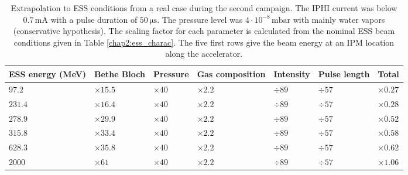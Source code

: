 \begin{table}[ht]
  \centering
  \caption[Extrapolation to ESS conditions from a real case during the second campaign]
  {Extrapolation to ESS conditions from a real case during the second campaign.
    The IPHI current was below $0.7\,\mathrm{mA}$ with a pulse duration of $50\, \mathrm{\mu s}$. The pressure level was $4 \cdot 10^{-8}\,\mathrm{mbar}$ with mainly water vapors (conservative hypothesis). The scaling factor for each parameter is calculated from the nominal ESS beam conditions given in Table \ref{chap2:ess_charac}. The five first rows give the beam energy at an IPM location along the accelerator.}
  \label{chap4:extrapolationMCP}
  \begin{tabularx}{\linewidth}{XXXXXXX}
    \toprule    ESS energy (MeV) & Bethe Bloch   & Pressure     & Gas composition & Intensity & Pulse length & Total         \\
    \midrule
    \(97.2\)                     & $\times 15.5$ & $\times 40 $ & $\times 2.2$    & $\div89$  & $\div57$     & $\times 0.27$ \\
    \(231.4\)                    & $\times 16.4$ & $\times 40$  & $\times 2.2$    & $\div89$  & $\div57$     & $\times 0.28$ \\
    \(278.9\)                    & $\times 29.9$ & $\times 40$  & $\times 2.2$    & $\div89$  & $\div57$     & $\times 0.52$ \\
    \(315.8\)                    & $\times 33.4$ & $\times 40$  & $\times 2.2$    & $\div89$  & $\div57$     & $\times 0.58$ \\
    \(628.3\)                    & $\times 35.8$ & $\times 40$  & $\times 2.2$    & $\div89$  & $\div57$     & $\times 0.62$ \\
    \(2000\)                   & $\times 61$   & $\times 40$  & $\times 2.2$    & $\div89$  & $\div57$     & $\times 1.06$ \\
    \bottomrule
  \end{tabularx}
\end{table}

